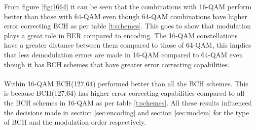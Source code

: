 \documentclass[11pt]{report}
\begin{document}
\vspace{12pt}
From figure \ref{fig:1664} it can be seen that the combinations with 16-QAM perform better than those with 64-QAM even though 64-QAM combinations have higher error correcting BCH as per table \ref{t:schemes}. This goes to show that modulation plays a great role in BER compared to encoding. The 16-QAM constellations have a greater distance between them compared to those of 64-QAM, this implies that less demodulation errors are made in 16-QAM compared to 64-QAM even though it has BCH schemes that have greater error correcting capabilities.
\\
\\
Within 16-QAM BCH(127,64) performed better than all the BCH schemes. This is because BCH(127,64) has higher error correcting capabilities compared to all the BCH schemes in 16-QAM as per table \ref{t:schemes}. All these results influenced the decisions made in section \ref{sec:encoding} and section \ref{sec:modem} for the type of BCH and the modulation order respectively.
 
\end{document}
